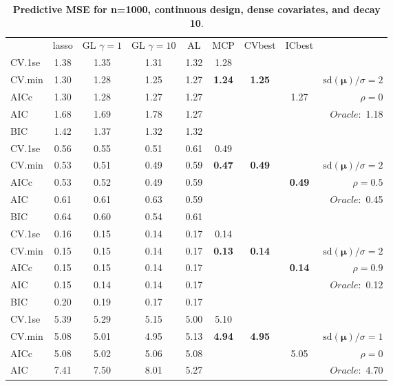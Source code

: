 \begin{table}\vspace{-.5cm}
\caption[l]{ { \bf Predictive MSE for n=1000, continuous design, 
dense covariates, and  decay  10}.}
\vspace{-.5cm}
\footnotesize{}
\begin{center}
\begin{tabular}{l*{7}{c}|r}
 & lasso & GL $\gamma=1$ & GL $\gamma=10$ & AL & MCP  & CVbest & ICbest  \\
\cline{1-9}
CV.1se & 1.38 & 1.35 & 1.31 & 1.32 & 1.28 & & & \\
CV.min & 1.30 & 1.28 & 1.25 & 1.27 & {\bf 1.24} & {\bf 1.25} & & $\mathrm{sd}(\mathbf{\mu})/\sigma=2$ \\
AICc & 1.30 & 1.28 & 1.27 & 1.27 & & & 1.27 &  $\rho=0$ \\
AIC & 1.68 & 1.69 & 1.78 & 1.27 & & & &  \multirow{2}{*}{$Oracle: $ 1.18} \\
BIC & 1.42 & 1.37 & 1.32 & 1.32 & & & &  \\
 \hline 
CV.1se & 0.56 & 0.55 & 0.51 & 0.61 & 0.49 & & & \\
CV.min & 0.53 & 0.51 & 0.49 & 0.59 & {\bf 0.47} & {\bf 0.49} & & $\mathrm{sd}(\mathbf{\mu})/\sigma=2$ \\
AICc & 0.53 & 0.52 & 0.49 & 0.59 & & & {\bf 0.49} &  $\rho=0.5$ \\
AIC & 0.61 & 0.61 & 0.63 & 0.59 & & & &  \multirow{2}{*}{$Oracle: $ 0.45} \\
BIC & 0.64 & 0.60 & 0.54 & 0.61 & & & &  \\
 \hline 
CV.1se & 0.16 & 0.15 & 0.14 & 0.17 & 0.14 & & & \\
CV.min & 0.15 & 0.15 & 0.14 & 0.17 & {\bf 0.13} & {\bf 0.14} & & $\mathrm{sd}(\mathbf{\mu})/\sigma=2$ \\
AICc & 0.15 & 0.15 & 0.14 & 0.17 & & & {\bf 0.14} &  $\rho=0.9$ \\
AIC & 0.15 & 0.14 & 0.14 & 0.17 & & & &  \multirow{2}{*}{$Oracle: $ 0.12} \\
BIC & 0.20 & 0.19 & 0.17 & 0.17 & & & &  \\
 \hline 
CV.1se & 5.39 & 5.29 & 5.15 & 5.00 & 5.10 & & & \\
CV.min & 5.08 & 5.01 & 4.95 & 5.13 & {\bf 4.94} & {\bf 4.95} & & $\mathrm{sd}(\mathbf{\mu})/\sigma=1$ \\
AICc & 5.08 & 5.02 & 5.06 & 5.08 & & & 5.05 &  $\rho=0$ \\
AIC & 7.41 & 7.50 & 8.01 & 5.27 & & & &  \multirow{2}{*}{$Oracle: $ 4.70} \\

\end{tabular}
\end{center}
\end{table}
